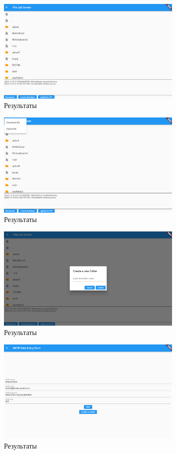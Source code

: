 \documentclass[a4paper, 14pt]{extarticle}
\begin{document}
\begin{figure}[!htb]
	\centering
	\includegraphics[width=0.8\textwidth]{img3}
\caption{Результаты}
\label{fig:img3}
\end{figure}

\begin{figure}[!htb]
	\centering
	\includegraphics[width=0.8\textwidth]{img4}
\caption{Результаты}
\label{fig:img4}
\end{figure}

\begin{figure}[!htb]
	\centering
	\includegraphics[width=0.8\textwidth]{img5}
\caption{Результаты}
\label{fig:img5}
\end{figure}

\begin{figure}[!htb]
	\centering
	\includegraphics[width=0.8\textwidth]{img6}
\caption{Результаты}
\label{fig:img6}
\end{figure}
\end{document}
